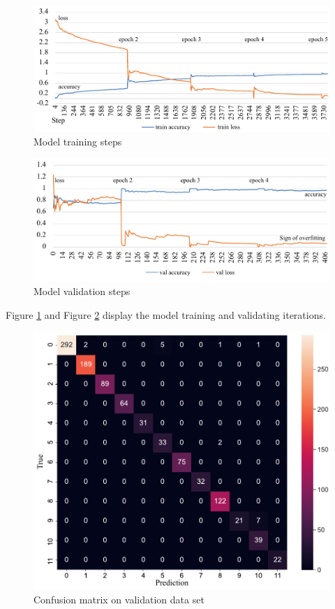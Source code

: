 \begin{figure}[!ht]
    \centering
    \includegraphics[width=.85\textwidth]{evaluation/imgs/5-train-step.pdf}
    \caption{Model training steps}
    \label{fig:5-train-step}
\end{figure}
\begin{figure}[!ht]
    \centering
    \includegraphics[width=.85\textwidth]{evaluation/imgs/5-val-steps.pdf}
    \caption{Model validation steps}
    \label{fig:5-val-steps}
\end{figure}

Figure \ref{fig:5-train-step} and Figure \ref{fig:5-val-steps} display the model training and validating iterations.

\clearpage
\begin{figure}[H]
    \centering
    \includegraphics[width=.74\textwidth]{evaluation/imgs/5-confusion_matrix_val.pdf}
    \caption{Confusion matrix on validation data set}
    \label{fig:5-confusion_matrix_val}
\end{figure}

